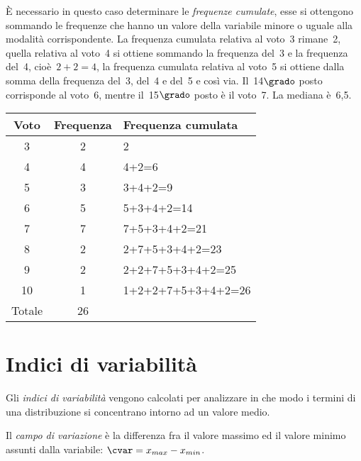 \begin{esempio}
\begin{esempio}
È necessario in questo caso determinare le \emph{frequenze cumulate}, esse 
si ottengono sommando le frequenze che hanno un valore della
variabile minore o uguale alla modalità corrispondente.
La frequenza cumulata relativa al voto~3 rimane~2, quella relativa al 
voto~4 si ottiene sommando
la frequenza del~3 e la frequenza del~4, cioè~\(2+2=4\), la frequenza 
cumulata relativa al voto~5 si ottiene dalla somma
della frequenza del~3, del~4 e del~5 e così via. Il~14\(\grado\) posto 
corrisponde al voto~6, mentre il~15\(\grado\) posto è il voto~7.
La mediana è~6,5.
\begin{center}
\begin{tabular}{ccl}
\toprule
Voto & Frequenza & Frequenza cumulata\\
\midrule
3 & 2 & 2 \\
4 & 4 & 4+2=6 \\
5 & 3 & 3+4+2=9 \\
6 & 5 & 5+3+4+2=14 \\
7 & 7 & 7+5+3+4+2=21 \\
8 & 2 & 2+7+5+3+4+2=23 \\
9 & 2 & 2+2+7+5+3+4+2=25 \\
10 & 1 & 1+2+2+7+5+3+4+2=26 \\
\midrule
Totale & 26 & \\
\bottomrule
\end{tabular}
\end{center}
\end{esempio}



\section{Indici di variabilità}
\label{sec:stat02_variabilita}

Gli \emph{indici di variabilità} vengono calcolati per analizzare in che 
modo i termini di una distribuzione si concentrano intorno ad un valore 
medio.

\begin{definizione}
Il \emph{campo di variazione} è la differenza fra il valore massimo ed il 
valore minimo assunti dalla
variabile: \(\cvar = x_{max} - x_{min}\).
\end{definizione}


\end{esempio}
